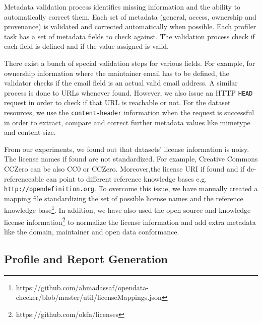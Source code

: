 \documentclass{sig-alternate}
\begin{document}
Metadata validation process identifies missing information and the ability to automatically correct them. Each set of metadata (general, access, ownership and provenance) is validated and corrected automatically when possible. Each profiler task has a set of metadata fields to check against. The validation process check if each field is defined and if the value assigned is valid.

There exist a bunch of special validation steps for various fields. For example, for ownership information where the maintainer email has to be defined, the validator checks if the email field is an actual valid email address. A similar process is done to URLs whenever found. However, we also issue an HTTP \texttt{HEAD} request in order to check if that URL is reachable or not. For the dataset resources, we use the \texttt{content-header} information when the request is successful in order to extract, compare and correct further metadata values like mimetype and content size.

From our experiments, we found out that datasets' license information is noisy. The license names if found are not standardized. For example, Creative Commons CCZero can be also CC0 or CCZero. Moreover,the license URI if found and if de-referenceable can point to different reference knowledge bases e.g. \texttt{http://opendefinition.org}. To overcome this issue, we have manually created a mapping file standardizing the set of possible license names and the reference knowledge base\footnote{https://github.com/ahmadassaf/opendata-checker/blob/master/util/licenseMappings.json}. In addition, we have also used the open source and knowledge license information\footnote{https://github.com/okfn/licenses} to normalize the license information and add extra metadata like the domain, maintainer and open data conformance.

\subsection{Profile and Report Generation}
\end{document}
